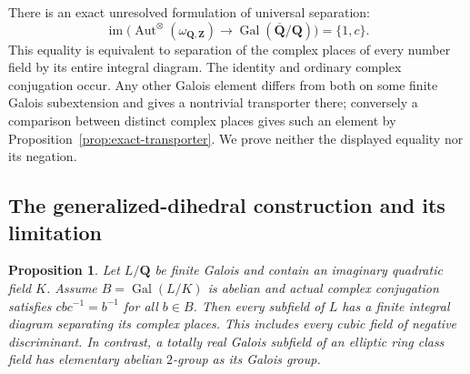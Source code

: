 \documentclass[11pt]{article}
\newtheorem{proposition}[theorem]{Proposition}
\theoremstyle{definition}\newtheorem{definition}[theorem]{Definition}
\theoremstyle{remark}\newtheorem{remark}[theorem]{Remark}
\newcommand{\Q}{\mathbf Q}\newcommand{\Z}{\mathbf Z}
\newcommand{\Qb}{\overline{\mathbf Q}}\newcommand{\Fp}{\mathbf F_p}
\DeclareMathOperator{\Aut}{Aut}\DeclareMathOperator{\Isom}{Isom}
\DeclareMathOperator{\Gal}{Gal}\DeclareMathOperator{\im}{im}
\begin{document}
There is an exact unresolved formulation of universal separation:
\[
 \operatorname{im}\bigl(\Aut^\otimes(\omega_{\Q,\Z})
                  \longrightarrow\Gal(\Qb/\Q)\bigr)=\{1,c\}.
\]
This equality is equivalent to separation of the complex places of every
number field by its entire integral diagram. The identity and ordinary
complex conjugation occur. Any other Galois element differs from both
on some finite Galois subextension and gives a nontrivial transporter
there; conversely a comparison between distinct complex places gives
such an element by Proposition~\ref{prop:exact-transporter}. We prove
neither the displayed equality nor its negation.

\subsection{The generalized-dihedral construction and its limitation}
\begin{proposition}\label{prop:dihedral-test}
Let $L/\Q$ be finite Galois and contain an imaginary quadratic field $K$.
Assume $B=\Gal(L/K)$ is abelian and actual complex conjugation satisfies
$cbc^{-1}=b^{-1}$ for all $b\in B$. Then every subfield of $L$ has a finite
integral diagram separating its complex places. This includes every cubic
field of negative discriminant. In contrast, a totally real Galois
subfield of an elliptic ring class field has elementary abelian
$2$-group as its Galois group.
\end{proposition}
\end{document}
